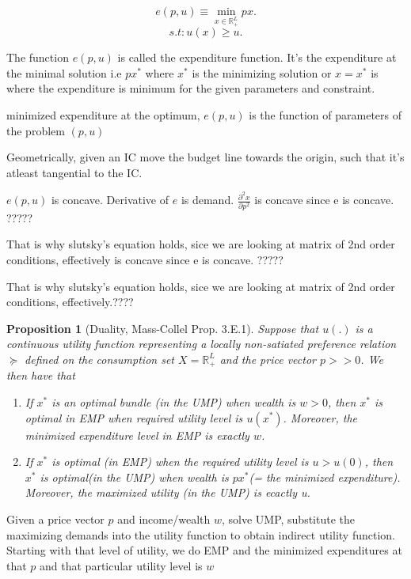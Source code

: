 \documentclass{tufte-handout}
\newtheorem{prop}{Proposition}
\begin{document}
\[ e(p,u) \equiv \min_{x \in \mathbb{R}_+ ^L} px  .\]  
\[s.t : u(x) \geq u .\]

\textbullet   The function $e(p,u)$ is called the expenditure function. It's the expenditure at the minimal solution i.e  $px^*$ where  $x^*$ is the minimizing solution or  $x=x^*$ is where the expenditure is minimum for the given parameters and constraint.

 \textbullet  minimized expenditure at the optimum, $e(p,u)$ is the function of parameters of the problem  $(p,u)$

Geometrically, given an IC move the budget line towards the origin, such that it's atleast tangential to the IC.

$e(p,u)$ is concave. Derivative of  $e$ is demand.  $\frac{\partial^2 x}{\partial p^2}$ is concave since e is concave. ?????

That is why slutsky's equation holds, sice we are looking at matrix of 2nd order conditions, effectively is concave since e is concave. ?????

That is why slutsky's equation holds, sice we are looking at matrix of 2nd order conditions, effectively.????






\begin{prop}[Duality, Mass-Collel Prop. 3.E.1]
		Suppose that $u(.)$ is a continuous utility function representing a locally non-satiated preference relation $\succeq$ defined on the consumption set  $X = \mathbb{R}^L_+$ and the price vector  $p >> 0$. We then have that 
		\begin{enumerate}
				\item If $x^*$ is an optimal bundle (in the UMP) when wealth is  $w > 0$, then  $x^*$ is optimal in EMP when required utility level is  $u(x^*)$. Moreover, the minimized expenditure level in EMP is exactly  $w$.
		
				\item If $x^*$ is optimal (in EMP) when the required utility level is  $u > u(0)$, then  $x^*$ is optimal(in the UMP) when wealth is  $px^*$(= the minimized expenditure). Moreover, the maximized utility (in the UMP) is ecactly u.
		\end{enumerate}
		
\end{prop}

\clearpage

Given a price vector $p$ and  income/wealth $w$, solve UMP, substitute the maximizing demands into the utility function to obtain indirect utility function. Starting with that level of utility, we do EMP and the minimized expenditures at that  $p$ and that particular utility level is  $w$
\end{document}
